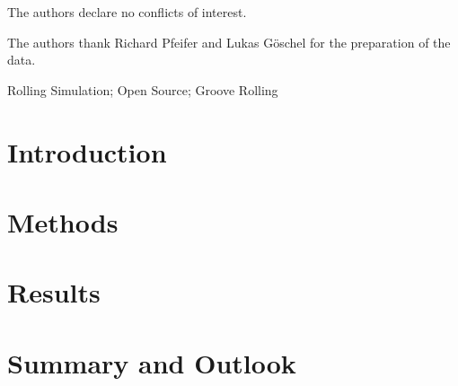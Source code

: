 \documentclass[DIV=13]{scrartcl}
\begin{document}
{        
        The authors declare no conflicts of interest.

        The authors thank Richard Pfeifer and Lukas Göschel for the preparation of the data.

        Rolling Simulation; Open Source; Groove Rolling
    }

    \maketitle

    \begin{abstract}

    \end{abstract}


    \section{Introduction}\label{sec:introduction}

    


    \section{Methods}\label{sec:methods}

    


    \section{Results}\label{sec:results}

    


    \section{Summary and Outlook}\label{sec:summary}

    

    \printbibliography
\end{document}
